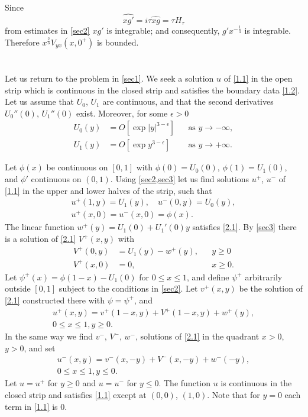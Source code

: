 \documentclass[leqno]{article}
\numberwithin{equation}{section}
\theoremstyle{plain}
\begin{document}
Since
\begin{equation*}
	\widehat{xg'} = i\tau \widehat{xg} = \tau H_\tau
\end{equation*}
from estimates in \cref{sec2} $xg'$ is integrable; and consequently, $g'x^{-\frac 13}$ is integrable.
Therefore $x^{\frac 23} V_{yx} (x,0^+)$ is bounded.

\section{}
\label{sec4}

Let us return to the problem in \cref{sec1}.
We seek a solution $u$ of \eqref{1.1} in the open strip which is continuous in the closed strip and satisfies the boundary data \eqref{1.2}.
Let us assume that $U_0$, $U_1$ are continuous, and that the second derivatives $U_0''(0)$, $U_1''(0)$ exist.
Moreover, for some $\epsilon > 0$
\begin{align*}
	U_0(y) & = O[\exp |y|^{3-\epsilon}]
	&& \text{as } y \to -\infty, \\
	U_1(y) & =  O[\exp y^{3-\epsilon}]
	&& \text{as } y \to +\infty.
\end{align*}

Let $\phi(x)$ be continuous on $[0,1]$ with $\phi(0) = U_0(0)$, $\phi(1) = U_1(0)$, and $\phi'$ continuous on $(0,1)$.
Using \cref{sec2,sec3} let us find solutions $u^+$, $u^-$ of \eqref{1.1} in the upper and lower halves of the strip, such that
\begin{gather*}
		u^+(1,y) = U_1(y), \quad u^-(0,y) = U_0(y), \\
		u^+(x,0) = u^-(x,0) = \phi(x).
\end{gather*}
The linear function $w^+(y) = U_1(0) + U_1'(0)y$ satisfies \eqref{2.1}.
By \cref{sec3} there is a solution of \eqref{2.1} $V^+(x,y)$ with
\begin{align*}
	V^+(0,y) & = U_1(y) - w^+(y), && y \geq 0\\
	V^+(x,0) & = 0, && x \geq 0.
\end{align*}
Let $\psi^+(x) = \phi(1-x)-U_1(0)$ for $0 \leq x \leq 1$, and define $\psi^+$ arbitrarily outside $[0,1]$ subject to the conditions in \cref{sec2}.
Let $v^+(x,y)$ be the solution of \eqref{2.1} constructed there with $\psi = \psi^+$, and
\begin{gather*}
	u^+(x,y) = v^+(1-x,y)+V^+(1-x,y)+w^+(y), \\
	0 \leq x \leq 1, y \geq 0.
\end{gather*}
In the same way we find $v^-$, $V^-$, $w^-$, solutions of \eqref{2.1} in the quadrant $x > 0$, $y > 0$, and set
\begin{gather*}
	u^-(x,y) = v^-(x,-y)+V^-(x,-y)+w^-(-y), \\
	0 \leq x \leq 1, y \leq 0.	
\end{gather*}
Let $u = u^+$ for $y \geq 0$ and $u = u^-$ for $y \leq 0$.
The function $u$ is continuous in the closed strip and satisfies \eqref{1.1} except at $(0,0)$, $(1,0)$.
Note that for $y = 0$ each term in \eqref{1.1} is $0$.
\end{document}
